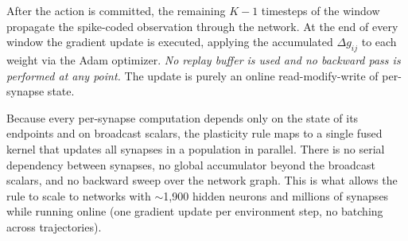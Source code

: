 \noindent
After the action is committed, the remaining $K-1$ timesteps of
the window propagate the spike-coded observation through the
network. At the end of every window the gradient update is executed,
applying the accumulated $\Delta g_{ij}$ to each weight via the Adam
optimizer. \emph{No replay buffer is used and no backward pass
is performed at any point.} The update is purely an online
read-modify-write of per-synapse state.

Because every per-synapse computation depends only on the
state of its endpoints and on broadcast scalars, the
plasticity rule maps to a single fused kernel that updates
all synapses in a population in parallel. There is no
serial dependency between synapses, no global accumulator
beyond the broadcast scalars, and no backward sweep over
the network graph. This is what allows the rule to scale
to networks with $\sim$1{,}900 hidden neurons and millions 
of synapses while running online (one
gradient update per environment step, no batching across
trajectories).


